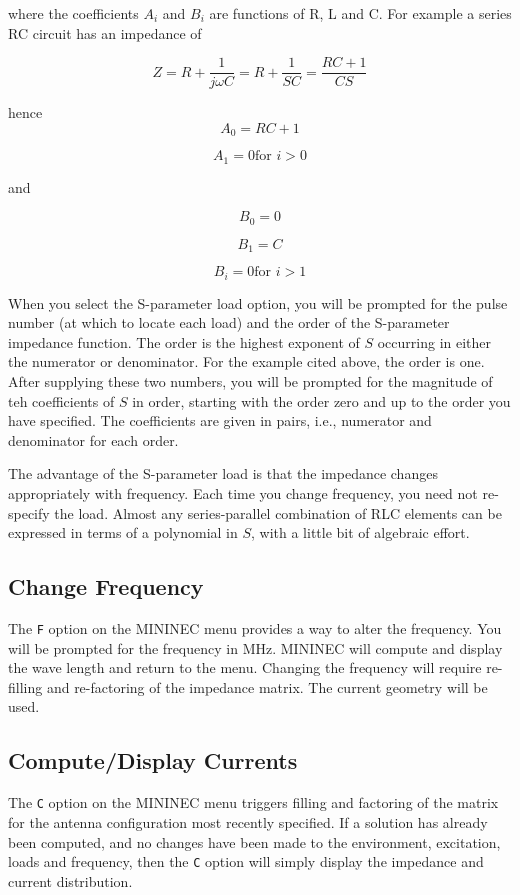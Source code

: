 \documentclass[12pt]{article}
\begin{document}
where the coefficients $A_i$ and $B_i$ are functions of R, L and C. For
example a series RC circuit has an impedance of

\[ Z = R + \frac{1}{j\omega C} = R + \frac{1}{SC} = \frac{RC+1}{CS}
\]

hence
\[A_0 = RC + 1 \]

\[A_1 = 0 \mbox{for }i > 0 \]

and

\[B_0 = 0\]

\[B_1 = C\]

\[B_i = 0 \mbox{for }i>1\]

When you select the S-parameter load option, you will be prompted for
the pulse number (at which to locate each load) and the order of the
S-parameter impedance function. The order is the highest exponent of $S$
occurring in either the numerator or denominator. For the example cited
above, the order is one. After supplying these two numbers, you will be
prompted for the magnitude of teh coefficients of $S$ in order, starting
with the order zero and up to the order you have specified. The
coefficients are given in pairs, i.e., numerator and denominator for
each order.

The advantage of the S-parameter load is that the impedance changes
appropriately with frequency. Each time you change frequency, you need
not re-specify the load. Almost any series-parallel combination of RLC
elements can be expressed in terms of a polynomial in $S$, with a little
bit of algebraic effort.

\subsection{Change Frequency}
The \verb+F+ option on the MININEC menu provides a way to alter the
frequency. You will be prompted for the frequency in MHz. MININEC will
compute and display the wave length and return to the menu. Changing the
frequency will require re-filling and re-factoring of the impedance
matrix. The current geometry will be used.

\subsection{Compute/Display Currents}
The \verb+C+ option on the MININEC menu triggers filling and factoring
of the matrix for the antenna configuration most recently specified. If
a solution has already been computed, and no changes have been made to
the environment, excitation, loads and frequency, then the \verb+C+
option will simply display the impedance and current distribution.
\end{document}
